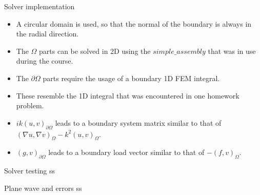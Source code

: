 \documentclass{beamer}
\begin{document}
\begin{frame}{Solver implementation}
 
\begin{itemize}
 \item A circular domain is used, so that the normal of the boundary is always in the radial direction.
 \item The $\Omega$ parts can be solved in 2D using the $simple\_assembly$ that was in use during the course.
 \item The $\partial \Omega$ parts require the usage of a boundary 1D FEM integral.
 \item These resemble the 1D integral that was encountered in one homework problem.
 \item $ik(u, v)_{\partial \Omega}$ leads to a boundary system matrix similar to that of $(\nabla u, \nabla v)_{\Omega} - k^2(u, v)_{\Omega}$.
 \item $(g, v)_{\partial \Omega}$ leads to a boundary load vector similar to that of $-(f, v)_{\Omega}$.
\end{itemize}

\end{frame}

\begin{frame}{Solver testing}
 ss
\end{frame}

\begin{frame}{Plane wave and errors}
 ss
\end{frame}
\end{document}
